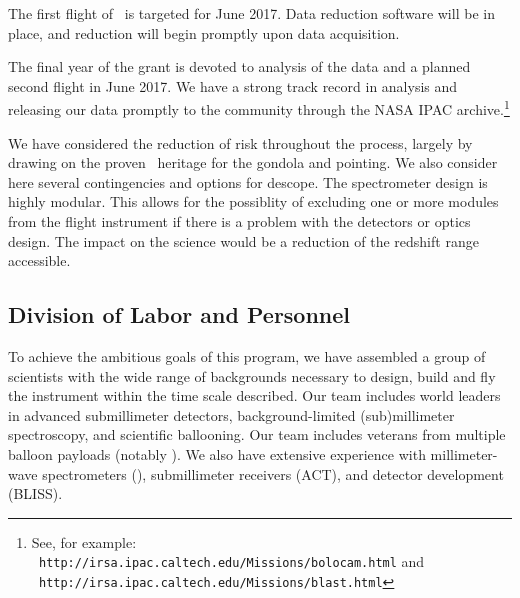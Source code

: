  The first flight of \name\
is targeted for June 2017.  Data reduction software will be in place,
and reduction will begin promptly upon data acquisition.

 The final year of the grant
is devoted to analysis of the data and a planned second flight in June 2017.  We have a strong track record in
analysis and releasing our data promptly to the community through the
NASA IPAC archive.\footnote{See, for example:\\ {\tt
http://irsa.ipac.caltech.edu/Missions/bolocam.html} and\\ {\tt
http://irsa.ipac.caltech.edu/Missions/blast.html}}

We have considered the reduction of risk throughout the process,
largely by drawing on the proven \blast\ heritage for the gondola and
pointing.  We also consider here
several contingencies and options for descope.  The \name
spectrometer design is highly modular.  This allows for the possiblity
of excluding one or more modules from the flight instrument if there
is a problem with the detectors or optics design.  The impact on the
science would be a reduction of the redshift range accessible.  


\subsection{Division of Labor and Personnel} 

To achieve the ambitious goals of this program, we have assembled a
group of scientists with the wide range of backgrounds necessary to
design, build and fly the instrument within the time scale described.
Our
team includes world leaders in advanced submillimeter detectors,
background-limited (sub)millimeter spectroscopy, and scientific
ballooning.  Our team includes veterans from multiple balloon payloads
(notably \blast).%
We also have
extensive experience with millimeter-wave spectrometers (\zspec),
submillimeter receivers (ACT), and detector development (BLISS).  

